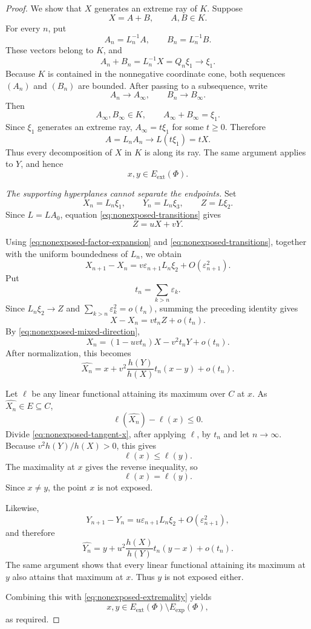 \documentclass[11pt,reqno]{amsart}
\theoremstyle{plain}
\theoremstyle{definition}
\theoremstyle{remark}
\numberwithin{equation}{section}
\begin{document}
\begin{proof}
We show that $X$ generates an extreme ray of $K$.
Suppose
\[
X=A+B,
\qquad A,B\in K.
\]
For every $n$, put
\[
A_n=L_n^{-1}A,
\qquad
B_n=L_n^{-1}B.
\]
These vectors belong to $K$, and
\[
A_n+B_n=L_n^{-1}X=Q_n\xi_1\longrightarrow\xi_1.
\]
Because $K$ is contained in the nonnegative coordinate cone,
both sequences $(A_n)$ and $(B_n)$ are bounded.
After passing to a subsequence, write
\[
A_n\longrightarrow A_\infty,
\qquad
B_n\longrightarrow B_\infty.
\]
Then
\[
A_\infty,B_\infty\in K,
\qquad
A_\infty+B_\infty=\xi_1.
\]
Since $\xi_1$ generates an extreme ray,
$A_\infty=t\xi_1$ for some $t\ge0$.
Therefore
\[
A=L_nA_n\longrightarrow L(t\xi_1)=tX.
\]
Thus every decomposition of $X$ in $K$ is along its ray.
The same argument applies to $Y$, and hence
\begin{equation}\label{eq:nonexposed-extremality}
x,y\in E_{\mathrm{ext}}(\Phi).
\end{equation}

\medskip
\noindent\textit{The supporting hyperplanes cannot separate the endpoints.}
Set
\[
X_n=L_n\xi_1,
\qquad
Y_n=L_n\xi_3,
\qquad
Z=L\xi_2.
\]
Since $L=LA_0$, equation
\eqref{eq:nonexposed-transitions} gives
\begin{equation}\label{eq:nonexposed-mixed-direction}
Z=uX+vY.
\end{equation}

Using \eqref{eq:nonexposed-factor-expansion} and
\eqref{eq:nonexposed-transitions}, together with the uniform
boundedness of $L_n$, we obtain
\[
X_{n+1}-X_n
=
v\varepsilon_{n+1}L_n\xi_2
+O(\varepsilon_{n+1}^2).
\]
Put
\[
t_n=\sum_{k>n}\varepsilon_k.
\]
Since $L_n\xi_2\to Z$ and
$\sum_{k>n}\varepsilon_k^2=o(t_n)$, summing the preceding
identity gives
\[
X-X_n=vt_nZ+o(t_n).
\]
By \eqref{eq:nonexposed-mixed-direction},
\[
X_n=(1-uvt_n)X-v^2t_nY+o(t_n).
\]
After normalization, this becomes
\begin{equation}\label{eq:nonexposed-tangent-x}
\widehat{X_n}
=
x+
v^2\frac{h(Y)}{h(X)}t_n(x-y)
+o(t_n).
\end{equation}

Let $\ell$ be any linear functional attaining its maximum
over $C$ at $x$.
As $\widehat{X_n}\in E\subseteq C$,
\[
\ell(\widehat{X_n})-\ell(x)\le0.
\]
Divide \eqref{eq:nonexposed-tangent-x}, after applying $\ell$,
by $t_n$ and let $n\to\infty$.
Because $v^2h(Y)/h(X)>0$, this gives
\[
\ell(x)\le\ell(y).
\]
The maximality at $x$ gives the reverse inequality, so
\[
\ell(x)=\ell(y).
\]
Since $x\ne y$, the point $x$ is not exposed.

Likewise,
\[
Y_{n+1}-Y_n
=
u\varepsilon_{n+1}L_n\xi_2
+O(\varepsilon_{n+1}^2),
\]
and therefore
\[
\widehat{Y_n}
=
y+
u^2\frac{h(X)}{h(Y)}t_n(y-x)
+o(t_n).
\]
The same argument shows that every linear functional attaining
its maximum at $y$ also attains that maximum at $x$.
Thus $y$ is not exposed either.

Combining this with \eqref{eq:nonexposed-extremality} yields
\[
x,y\in
E_{\mathrm{ext}}(\Phi)\setminus E_{\mathrm{exp}}(\Phi),
\]
as required.
\end{proof}
\end{document}
